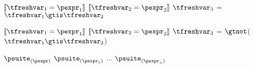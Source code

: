 \documentclass{article}
\begin{document}
\newsavebox{\compareIsBox}
\begin{lrbox}{\compareIsBox}
\begin{python}
$\meaningof{\tfreshvar_1 = \pexpr_1}$
$\meaningof{\tfreshvar_2 = \pexpr_2}$
$\tfreshvar_3$ = $\tfreshvar_1 \gtis \tfreshvar_2$
\end{python}
\end{lrbox}

\begin{mathpar}
\end{mathpar}

\newsavebox{\compareIsNotBox}
\begin{lrbox}{\compareIsNotBox}
\begin{python}
$\meaningof{\tfreshvar_1 = \pexpr_1}$
$\meaningof{\tfreshvar_2 = \pexpr_2}$
$\tfreshvar_3$ = $\gtnot$($\tfreshvar_1 \gtis \tfreshvar_2$)
\end{python}
\end{lrbox}

\begin{mathpar}
\end{mathpar}

\newsavebox{\callBox} %
\begin{lrbox}{\callBox}
\begin{python}
$\psuite_{(\pexpr)}$
$\psuite_{(\pexpr_1)}$
...
$\psuite_{(\pexpr_n)}$
\end{python}
\end{lrbox}

\begin{mathpar}
\end{mathpar}
\end{document}
